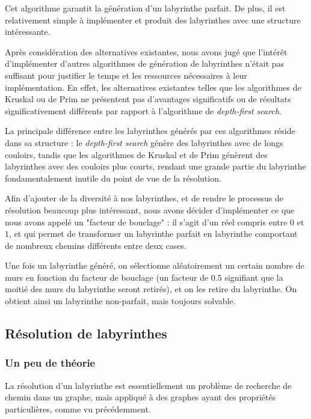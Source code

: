 \documentclass[12pt]{scrreprt} %
\begin{document}
Cet algorithme garantit la génération d'un labyrinthe parfait. De plus, il est relativement simple à implémenter et produit des labyrinthes avec une structure intéressante.

Après considération des alternatives existantes, nous avons jugé que l'intérêt d'implémenter d'autres algorithmes de génération de labyrinthes n'était pas suffisant pour justifier le temps et les ressources nécessaires à leur implémentation. En effet, les alternatives existantes telles que les algorithmes de Kruskal ou de Prim ne présentent pas d'avantages significatifs ou de résultats significativement différents par rapport à l'algorithme de \textit{depth-first search}.

La principale différence entre les labyrinthes générés par ces algorithmes réside dans sa structure : le \textit{depth-first search} génère des labyrinthes avec de longs couloirs, tandis que les algorithmes de Kruskal et de Prim génèrent des labyrinthes avec des couloirs plus courts, rendant une grande partie du labyrinthe fondamentalement inutile du point de vue de la résolution.

Afin d'ajouter de la diversité à nos labyrinthes, et de rendre le processus de résolution beaucoup plus intéressant, nous avons décider d'implémenter ce que nous avons appelé un "facteur de bouclage" : il s'agit d'un réel compris entre $0$ et $1$, et qui permet de transformer un labyrinthe parfait en labyrinthe comportant de nombreux chemins différents entre deux cases.

Une fois un labyrinthe généré, on sélectionne aléatoirement un certain nombre de murs en fonction du facteur de bouclage (un facteur de $0.5$ signifiant que la moitié des murs du labyrinthe seront retirés), et on les retire du labyrinthe. On obtient ainsi un labyrinthe non-parfait, mais toujours solvable.

\subsection{Résolution de labyrinthes}

\subsubsection{Un peu de théorie}

La résolution d'un labyrinthe est essentiellement un problème de recherche de chemin dans un graphe, mais appliqué à des graphes ayant des propriétés particulières, comme vu précédemment.
\end{document}

